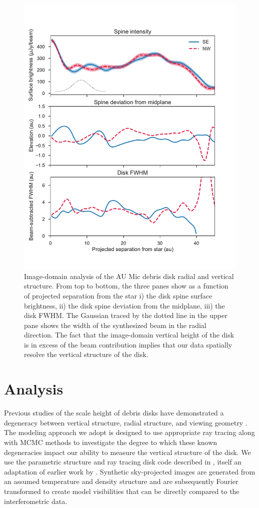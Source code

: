 \documentclass[12pt,oneside]{article}
\begin{document}
\begin{figure}
  \centering
  \includegraphics[width=.75\linewidth]{figures/boccaletti_plots}
  \caption{
  Image-domain analysis of the AU Mic debris disk radial and vertical structure. 
  From top to bottom, the three panes show as a function of projected separation from the star i) the disk spine surface brightness, ii) the disk spine deviation from the midplane, iii) the disk FWHM. 
  The Gaussian traced by the dotted line in the upper pane shows the width of the  synthesized beam in the radial direction.
  The fact that the image-domain vertical height of the disk is in excess of the beam contribution implies that our data spatially resolve the vertical structure of the disk.} 
  \label{fig: boccaletti}
\end{figure}



\section{Analysis}
\label{section: analysis}
Previous studies of the scale height of debris disks have demonstrated a degeneracy between vertical structure, radial structure, and viewing geometry \citep[e.g.][]{milli14}.  
The modeling approach we adopt is designed to use appropriate ray tracing along with MCMC methods to investigate the degree to which these known degeneracies impact our ability to measure the vertical structure of the disk.  
We use the parametric structure and ray tracing disk code described in \cite{flaherty15}, itself an adaptation of earlier work by \cite{rosenfeld13}.
Synthetic sky-projected images are generated from an assumed temperature and density structure and are subsequently Fourier transformed to create model visibilities that can be directly compared to the interferometric data.
\end{document}
